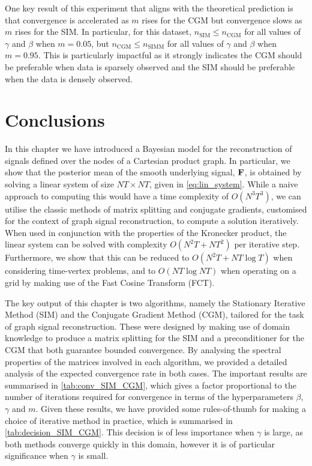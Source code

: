 One key result of this experiment that aligns with the theoretical prediction is that convergence is accelerated as $m$ rises for the CGM but convergence slows as $m$ rises for the SIM. In particular, for this dataset, $n_\text{SIM} \leq n_\text{CGM}$ for all values of $\gamma$ and $\beta$ when $m=0.05$, but $n_\text{CGM} \leq n_\text{SIMM}$ for all values of $\gamma$ and $\beta$ when $m=0.95$. This is particularly impactful as it strongly indicates the CGM should be preferable when data is sparsely observed and the SIM should be preferable when the data is densely observed. 


\section{Conclusions}

In this chapter we have introduced a Bayesian model for the reconstruction of signals defined over the nodes of a Cartesian product graph. In particular, we show that the posterior mean of the smooth underlying signal, $\mathbf{F}$, is obtained by solving a linear system of size $NT \times NT$, given in \cref{eq:lin_system}. While a naive approach to computing this would have a time complexity of $O(N^3T^3)$, we can utilise the classic methods of matrix splitting and conjugate gradients, customised for the context of graph signal reconstruction, to compute a solution iteratively. When used in conjunction with the properties of the Kronecker product, the linear system can be solved with complexity $O(N^2T + NT^2)$ per iterative step. Furthermore, we show that this can be reduced to $O(N^2T + NT \log T)$ when considering time-vertex problems, and to $O(NT \log NT)$ when operating on a grid by making use of the Fast Cosine Transform (FCT). 

The key output of this chapter is two algorithms, namely the Stationary Iterative Method (SIM) and the Conjugate Gradient Method (CGM), tailored for the task of graph signal reconstruction. These were designed by making use of domain knowledge to produce a matrix splitting for the SIM and a preconditioner for the CGM that both guarantee bounded convergence. By analysing the spectral properties of the matrices involved in each algorithm, we provided a detailed analysis of the expected convergence rate in both cases. The important results are summarised in \cref{tab:conv_SIM_CGM}, which gives a factor proportional to the number of iterations required for convergence in terms of the hyperparameters $\beta$, $\gamma$ and $m$. Given these results, we have provided some rules-of-thumb for making a choice of iterative method in practice, which is summarised in \cref{tab:decision_SIM_CGM}. This decision is of less importance when $\gamma$ is large, as both methods converge quickly in this domain, however it is of particular significance when $\gamma$ is small. 


